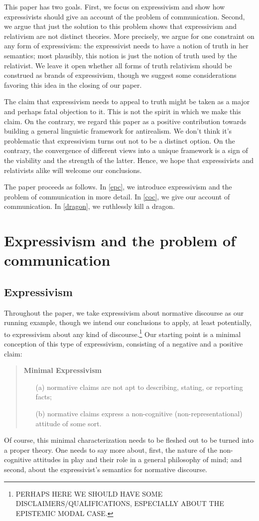 \documentclass[11pt,article,oneside]{memoir}
\begin{document}
This paper has two goals. First, we focus on expressivism and show how expressivists should give an account of the problem of communication. Second, we argue that just the solution to this problem shows that expressivism and relativism are not distinct theories. More precisely, we argue for one constraint on any form of expressivism: the expressivist needs to have a notion of truth in her semantics; most plausibly, this notion is just the notion of truth used by the relativist. We leave it open whether all forms of truth relativism should be construed as brands of expressivism, though we suggest some considerations favoring this idea in the closing of our paper.

The claim that expressivism needs to appeal to truth might be taken as a major and perhaps fatal objection to it. This is not the spirit in which we make this claim. On the contrary, we regard this paper as a positive contribution towards building a general linguistic framework for antirealism. We don't think it's problematic that expressivism turns out not to be a distinct option. On the contrary, the convergence of different views into a unique framework is a sign of the viability and the strength of the latter. Hence, we hope that expressivists and relativists alike will welcome our conclusions. 

The paper proceeds as follows. In \autoref{epc}, we introduce expressivism and the problem of communication in more detail. In \autoref{coc}, we give our account of communication. In \autoref{dragon}, we ruthlessly kill a dragon.

\section{Expressivism and the problem of communication}\label{epc}

\subsection{Expressivism}
Throughout the paper, we take expressivism about normative discourse as our running example, though we intend our conclusions to apply, at least potentially, to expressivism about any kind of discourse.\footnote{PERHAPS HERE WE SHOULD HAVE SOME DISCLAIMERS/QUALIFICATIONS, ESPECIALLY ABOUT THE EPISTEMIC MODAL CASE.} Our starting point is a minimal conception of this type of expressivism, consisting of a negative and a positive claim: 
\begin{quote}
\textbf{Minimal Expressivism}
\begin{itemize}
\item[(a)] normative claims are not apt to describing, stating, or reporting facts; 
\item[(b)] normative claims express a non-cognitive (non-representational) attitude of some sort. 
\end{itemize}
\end{quote}
Of course, this minimal characterization needs to be fleshed out to be turned into a proper theory. One needs to say more about, first, the nature of the non-cognitive attitudes in play and their role in a general philosophy of mind; and second, about the expressivist's semantics for normative discourse. 
\end{document}
